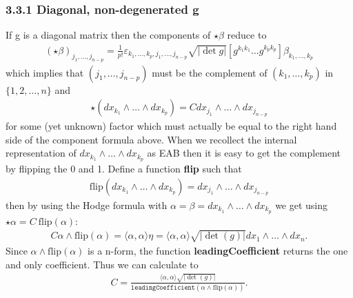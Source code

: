 \documentclass[letterpaper,10pt,english]{sphinxmanual}
\begin{document}
\subsubsection{3.3.1 Diagonal, non-degenerated g}
\label{section-3.0:diagonal-non-degenerated-g}
If g is a diagonal matrix then the components of \(\star \beta\) reduce to
\begin{equation*}
\begin{split}(\star \beta)_{j_1, \ldots, j_{n - p}} = \frac{1}{p!} \varepsilon_{k_1,
  \ldots, k_p, j_1, \ldots, j_{n - p}}  \sqrt{| \det g |}  [g^{k_1 k_1}
  \ldots g^{k_p k_p}] \beta_{k_1, \ldots, k_p}\end{split}
\end{equation*}
which implies that \((j_1, \ldots, j_{n - p})\) must be the complement of
\((k_1,\ldots, k_p)\) in \(\{ 1, 2, \ldots, n \}\) and
\begin{equation*}
\begin{split}\star (d x_{k_1} \wedge \ldots \wedge d x_{k_p}) = C d x_{j_1} \wedge
 \ldots \wedge d x_{j_{n - p}}\end{split}
\end{equation*}
for some (yet unknown) factor  which must actually be equal to the right
hand side of the component formula above. When we recollect the internal
representation of \(d x_{k_1} \wedge \ldots \wedge d x_{k_p}\) as
EAB then it is easy to get the complement by flipping the
0 and 1. Define a function \textbf{flip} such that
\begin{equation*}
\begin{split}\mathrm{flip} (d x_{k_1} \wedge \ldots \wedge d x_{k_p}) = d x_{j_1}
\wedge \ldots \wedge d x_{j_{n - p}}\end{split}
\end{equation*}
then by using the Hodge formula with
\(\alpha = \beta = dx_{k_1} \wedge \ldots \wedge d x_{k_p}\) we get using
\(\star \alpha = C\ \mathrm{flip} (\alpha)\):
\begin{equation*}
\begin{split}C \alpha \wedge \mathrm{flip} (\alpha) = \langle \alpha, \alpha \rangle \eta
 = \langle \alpha, \alpha \rangle \sqrt{| \det (g) |} d x_1 \wedge \ldots
 \wedge d x_n .\end{split}
\end{equation*}
Since \(\alpha \wedge \mathrm{flip} (\alpha)\) is a n-form, the function
\textbf{leadingCoefficient} returns the one and only coefficient. Thus we
can calculate  to
\begin{equation*}
\begin{split}C = \frac{\langle \alpha, \alpha \rangle \sqrt{| \det (g)
|}}{\mathtt{leadingCoefficient} (\alpha \wedge \mathrm{flip} (\alpha))} .\end{split}
\end{equation*}
\end{document}
